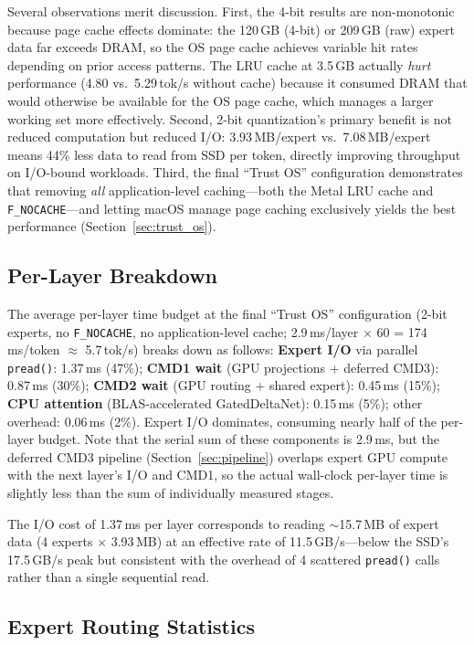 \documentclass[11pt,twocolumn]{article}
\begin{document}
Several observations merit discussion.
First, the 4-bit results are non-monotonic because page cache effects dominate: the 120\,GB (4-bit) or 209\,GB (raw) expert data far exceeds DRAM, so the OS page cache achieves variable hit rates depending on prior access patterns.
The LRU cache at 3.5\,GB actually \emph{hurt} performance (4.80 vs.\ 5.29\,tok/s without cache) because it consumed DRAM that would otherwise be available for the OS page cache, which manages a larger working set more effectively.
Second, 2-bit quantization's primary benefit is not reduced computation but reduced I/O: 3.93\,MB/expert vs.\ 7.08\,MB/expert means 44\% less data to read from SSD per token, directly improving throughput on I/O-bound workloads.
Third, the final ``Trust OS'' configuration demonstrates that removing \emph{all} application-level caching---both the Metal LRU cache and \texttt{F\_NOCACHE}---and letting macOS manage page caching exclusively yields the best performance (Section~\ref{sec:trust_os}).

\subsection{Per-Layer Breakdown}

The average per-layer time budget at the final ``Trust OS'' configuration (2-bit experts, no \texttt{F\_NOCACHE}, no application-level cache; 2.9\,ms/layer $\times$ 60 = 174\,ms/token $\approx$ 5.7\,tok/s) breaks down as follows: \textbf{Expert I/O} via parallel \texttt{pread()}: 1.37\,ms (47\%); \textbf{CMD1 wait} (GPU projections + deferred CMD3): 0.87\,ms (30\%); \textbf{CMD2 wait} (GPU routing + shared expert): 0.45\,ms (15\%); \textbf{CPU attention} (BLAS-accelerated GatedDeltaNet): 0.15\,ms (5\%); other overhead: 0.06\,ms (2\%).
Expert I/O dominates, consuming nearly half of the per-layer budget.
Note that the serial sum of these components is 2.9\,ms, but the deferred CMD3 pipeline (Section~\ref{sec:pipeline}) overlaps expert GPU compute with the next layer's I/O and CMD1, so the actual wall-clock per-layer time is slightly less than the sum of individually measured stages.

The I/O cost of 1.37\,ms per layer corresponds to reading $\sim$15.7\,MB of expert data (4 experts $\times$ 3.93\,MB) at an effective rate of 11.5\,GB/s---below the SSD's 17.5\,GB/s peak but consistent with the overhead of 4 scattered \texttt{pread()} calls rather than a single sequential read.

\subsection{Expert Routing Statistics}
\end{document}
